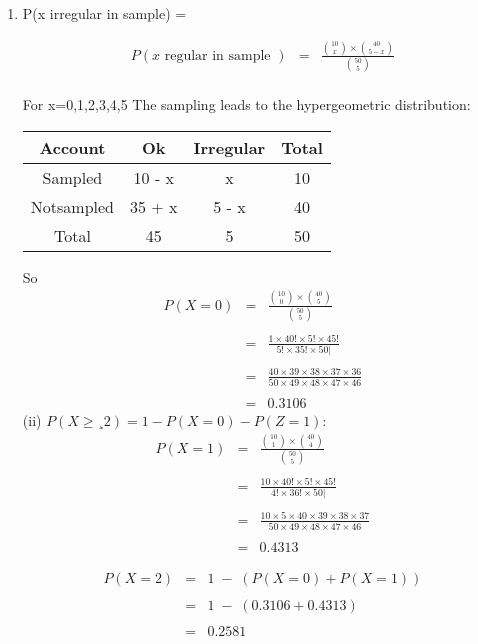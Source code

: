 \documentclass[a4paper,12pt]{article}
\begin{document}
\begin{enumerate}
\item P(x irregular in sample) =


\begin{eqnarray*}
P(x \mbox{ regular in sample }) &=& \frac{ {10 \choose x} \times {40 \choose 5-x} }{ {50 \choose 5} } \\
\end{eqnarray*}

For x=0,1,2,3,4,5
The sampling leads to the hypergeometric distribution:

\begin{center}
\begin{tabular}{|c|c|c||c|} \hline
Account & Ok & Irregular &  Total\\ \hline
Sampled & 10 - x & x & 10\\ \hline 
Notsampled & 35 + x & 5 - x & 40\\ \hline  \hline
Total & 45 & 5 & 50 \\ \hline
\end{tabular}
\end{center}
So
\begin{eqnarray*}
P(X=0) &=& \frac{ {10 \choose 0} \times {40 \choose 5} }{ {50 \choose 5}}\\
& &  \\
&=& \frac{1 \times 40! \times 5!  \times 45!}{5! \times 35! \times 50|}\\
& &  \\
&=& \frac{ 40 \times 39 \times 38 \times 37 \times 36}{50 \times 49 \times 48 \times 47 \times 46}\\
& &  \\
&=& 0.3106
\end{eqnarray*}
(ii)
$P(X \geq¸ 2) = 1 - P(X = 0) - P(Z = 1):$
\begin{eqnarray*}
P(X=1) &=& \frac{ {10 \choose 1} \times {40 \choose 4} }{ {50 \choose 5}}\\
& &  \\
&=& \frac{10 \times 40! \times 5!  \times 45!}{4! \times 36! \times 50|}\\
& &  \\
&=& \frac{10 \times 5 \times 40 \times 39 \times 38 \times 37}{50 \times 49 \times 48 \times 47 \times 46}\\
& &  \\
&=& 0.4313
\end{eqnarray*}

\begin{eqnarray*}
P( X = 2) &=& 1\;-\; \left( P( X = 0) + P( X = 1) \right) \\
& & \\
&=& 1\;-\; \left( 0.3106 + 0.4313 \right) \\
& & \\
&=& 0.2581\\
\end{eqnarray*}


\end{enumerate}
\end{document}
